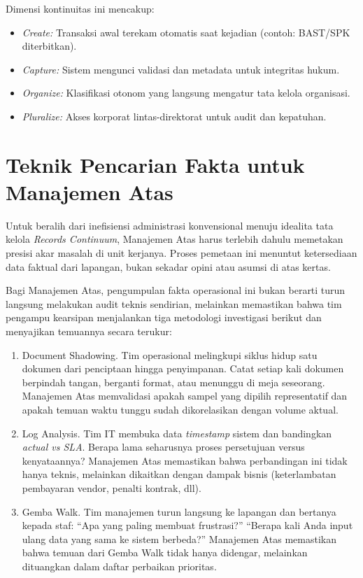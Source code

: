 \documentclass[12pt,a4paper]{report}
\begin{document}
Dimensi kontinuitas ini mencakup:
\begin{itemize}[leftmargin=*]
    \item \textit{Create:} Transaksi awal terekam otomatis saat kejadian (contoh: BAST/SPK diterbitkan).
    \item \textit{Capture:} Sistem mengunci validasi dan metadata untuk integritas hukum.
    \item \textit{Organize:} Klasifikasi otonom yang langsung mengatur tata kelola organisasi.
    \item \textit{Pluralize:} Akses korporat lintas-direktorat untuk audit dan kepatuhan.
\end{itemize}



\section{Teknik Pencarian Fakta untuk Manajemen Atas}

Untuk beralih dari inefisiensi administrasi konvensional menuju idealita tata kelola \textit{Records Continuum}, Manajemen Atas harus terlebih dahulu memetakan presisi akar masalah di unit kerjanya. Proses pemetaan ini menuntut ketersediaan data faktual dari lapangan, bukan sekadar opini atau asumsi di atas kertas. 

Bagi Manajemen Atas, pengumpulan fakta operasional ini bukan berarti turun langsung melakukan audit teknis sendirian, melainkan memastikan bahwa tim pengampu kearsipan menjalankan tiga metodologi investigasi berikut dan menyajikan temuannya secara terukur:

\begin{enumerate}[leftmargin=*]
    \item Document Shadowing. Tim operasional melingkupi siklus hidup satu dokumen dari penciptaan hingga penyimpanan. Catat setiap kali dokumen berpindah tangan, berganti format, atau menunggu di meja seseorang. Manajemen Atas memvalidasi apakah sampel yang dipilih representatif dan apakah temuan waktu tunggu sudah dikorelasikan dengan volume aktual.
    \item Log Analysis. Tim IT membuka data \textit{timestamp} sistem dan bandingkan \textit{actual vs SLA}. Berapa lama seharusnya proses persetujuan versus kenyataannya? Manajemen Atas memastikan bahwa perbandingan ini tidak hanya teknis, melainkan dikaitkan dengan dampak bisnis (keterlambatan pembayaran vendor, penalti kontrak, dll).
    \item Gemba Walk. Tim manajemen turun langsung ke lapangan dan bertanya kepada staf: ``Apa yang paling membuat frustrasi?'' ``Berapa kali Anda input ulang data yang sama ke sistem berbeda?'' Manajemen Atas memastikan bahwa temuan dari Gemba Walk tidak hanya didengar, melainkan dituangkan dalam daftar perbaikan prioritas.
\end{enumerate}
\end{document}
